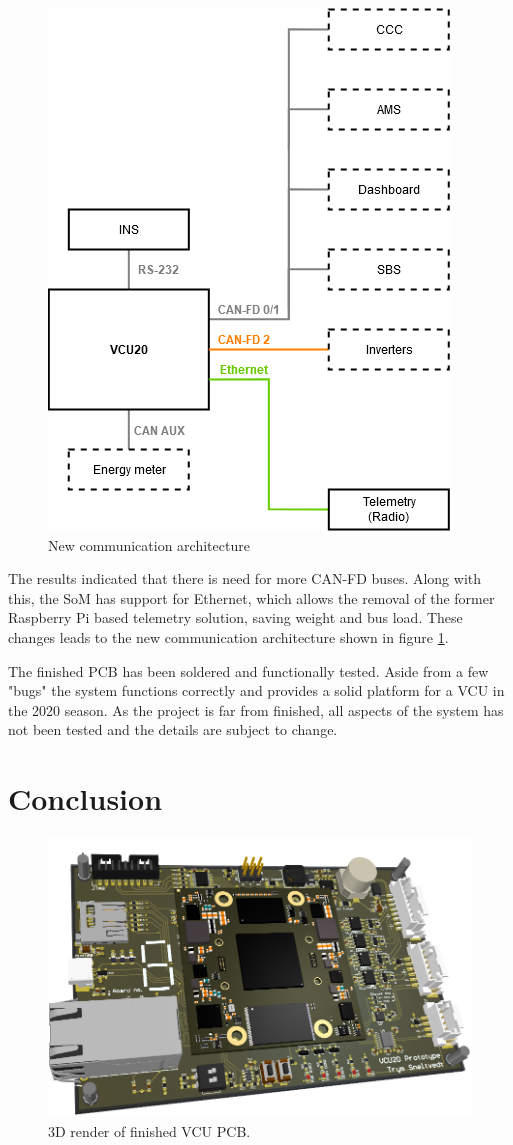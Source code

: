 \documentclass{article}
\begin{document}
\begin{multicols}{3}
\begin{figure}[H]
    \centering
    \includegraphics[width=.45\linewidth]{media/vcu20_system_2.png}
    \caption{New communication architecture}
    \label{fig:comarch_new}
\end{figure}

The results indicated that there is need for more CAN-FD buses. Along with this, the SoM has support for Ethernet, which allows the removal of the former Raspberry Pi based telemetry solution, saving weight and bus load. These changes leads to the new communication architecture shown in figure \ref{fig:comarch_new}.

The finished PCB has been soldered and functionally tested. Aside from a few "bugs" the system functions correctly and provides a solid platform for a VCU in the 2020 season. As the project is far from finished, all aspects of the system has not been tested and the details are subject to change.


\section*{Conclusion}

\begin{figure}[H]
    \centering
    \includegraphics[width=.7\linewidth]{media/vcu20_proto_render.png}
    \caption{3D render of finished VCU PCB.}
    \label{fig:render}
\end{figure}


\end{multicols}
\end{document}
